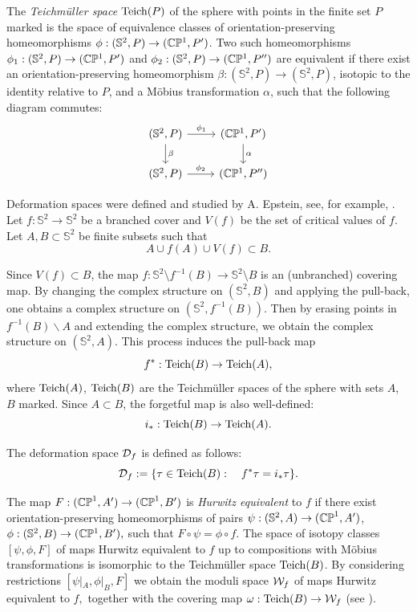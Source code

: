 \documentclass{article}
\begin{document}
The \textit{Teichm\"uller space} $\operatorname{Teich}(P)$ of the sphere with points in the finite set $P$ marked is the space of equivalence classes of orientation-preserving homeomorphisms $\phi:(\mathbb{S}^2, P)\to (\mathbb{C}{\mathbb P}^1, P')$. Two such homeomorphisms $\phi_1:(\mathbb{S}^2, P)\to (\mathbb{C}{\mathbb P}^1, P')$ and $\phi_2:(\mathbb{S}^2, P)\to (\mathbb{C}{\mathbb P}^1, P'')$ are equivalent if there exist an orientation-preserving homeomorphism $\beta:({\mathbb S}^2, P)\to ({\mathbb S}^2, P)$, isotopic to the identity relative to $P$, and a M\"{o}bius transformation $\alpha$, such that the following diagram commutes: 
\[
\begin{tikzcd}
(\S^2, P) \arrow{r}{\phi_1} \arrow{d}{\beta}  & (\C{\mathbb P}^1, P') \arrow{d}{\alpha}  \\
(\S^2, P) \arrow{r}{\phi_2} &  (\C{\mathbb P}^1, P'')
\end{tikzcd}
\]


Deformation spaces were defined and studied by A. Epstein, see, for example, \cite{HK,FKS}.
Let $f:{\mathbb S}^2\to {\mathbb S}^2$ be a branched cover and $V(f)$ be the  set of critical values of $f$. Let $A, B\subset {\mathbb S}^2$ be finite subsets such that 
$$
A\cup f(A)\cup V(f)\subset B.
$$

Since $V(f)\subset B$, the map $f:{\mathbb S}^2\setminus f^{-1}(B)\to {\mathbb S}^2\setminus B$ is an (unbranched) covering map. By changing the complex structure on $({\mathbb S}^2, B)$ and applying the pull-back, one obtains a complex structure on $({\mathbb S}^2, f^{-1}(B))$. Then by erasing points in $f^{-1}(B)\backslash A$ and extending the complex structure, we obtain the complex structure on $({\mathbb S}^2, A)$. This process induces the pull-back map 
 $$f^*: \operatorname{Teich}(B) \to \operatorname{Teich}(A),$$
 where $\operatorname{Teich} (A)$, $\operatorname{Teich} (B)$ are the Teichm\"{u}ller spaces of the sphere with sets $A$, $B$ marked.
 Since $A\subset B$, the forgetful map is also well-defined:
 $$i_*:\operatorname{Teich}( B)\to \operatorname{Teich}(A).$$

\begin{definition}
The deformation space $\mathcal{D}_f$ is defined as follows:  
$$\mathcal{D}_f:=\{\tau\in \operatorname{Teich} (B) :\quad f^*\tau = i_*\tau\}.$$ 
\end{definition}

The map $F:(\mathbb{CP}^1, A')\to(\mathbb{CP}^1, B')$ is \textit{Hurwitz equivalent} to $f$ if there exist orientation-preserving homeomorphisms of pairs $\psi:(\mathbb{S}^2,A)\to(\mathbb{CP}^1, A')$, $\phi:(\mathbb{S}^2,B)\to(\mathbb{C}{\mathbb P}^1, B'),$ such that $F\circ \psi=\phi \circ f$. The space of isotopy classes $[\psi,\phi,F]$ of maps Hurwitz equivalent to $f$ up to compositions with M\"obius transformations is isomorphic to the Teichm\"uller space $\operatorname{Teich}(B)$. By considering restrictions 
$[\psi|_A, \phi|_B, F]$ we obtain the moduli space $\mathcal{W}_f$ of maps Hurwitz equivalent to $f,$ together with the covering map $\omega:\operatorname{Teich}(B)\to\mathcal{W}_f$ (see \cite{HK}).
\end{document}
